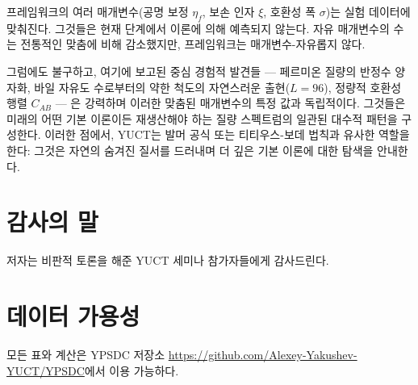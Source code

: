 \documentclass[11pt,a4paper]{article}
\begin{document}
	프레임워크의 여러 매개변수(공명 보정 \(\eta_f\), 보손 인자 \(\xi\), 호환성 폭 \(\sigma\))는 실험 데이터에 맞춰진다. 그것들은 현재 단계에서 이론에 의해 예측되지 않는다. 자유 매개변수의 수는 전통적인 맞춤에 비해 감소했지만, 프레임워크는 매개변수-자유롭지 않다.
	
	그럼에도 불구하고, 여기에 보고된 중심 경험적 발견들 — 페르미온 질량의 반정수 양자화, 바일 자유도 수로부터의 약한 척도의 자연스러운 출현(\(L=96\)), 정량적 호환성 행렬 \(C_{AB}\) — 은 강력하며 이러한 맞춤된 매개변수의 특정 값과 독립적이다. 그것들은 미래의 어떤 기본 이론이든 재생산해야 하는 질량 스펙트럼의 일관된 대수적 패턴을 구성한다. 이러한 점에서, YUCT는 발머 공식 또는 티티우스-보데 법칙과 유사한 역할을 한다: 그것은 자연의 숨겨진 질서를 드러내며 더 깊은 기본 이론에 대한 탐색을 안내한다.
	
	\section*{감사의 말}
	저자는 비판적 토론을 해준 YUCT 세미나 참가자들에게 감사드린다.
	
	\section*{데이터 가용성}
	모든 표와 계산은 YPSDC 저장소 \url{https://github.com/Alexey-Yakushev-YUCT/YPSDC}에서 이용 가능하다.
	
\end{document}
